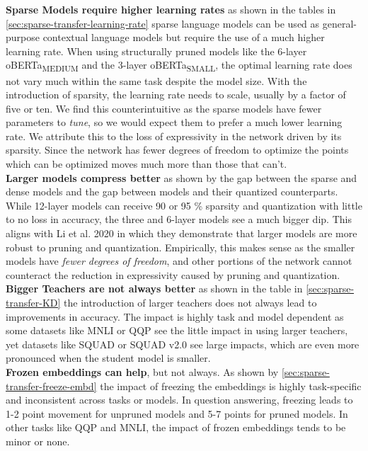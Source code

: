 \textbf{Sparse Models require higher learning rates} as shown in the tables in \ref{sec:sparse-transfer-learning-rate} sparse language models can be used as general-purpose contextual language models but require the use of a much higher learning rate. When using structurally pruned models like the 6-layer oBERTa\textsubscript{MEDIUM} and the 3-layer oBERTa\textsubscript{SMALL}, the optimal learning rate does not vary much within the same task despite the model size. With the introduction of sparsity, the learning rate needs to scale, usually by a factor of five or ten. We find this counterintuitive as the sparse models have fewer parameters to \textit{tune}, so we would expect them to prefer a much lower learning rate. We attribute this to the loss of expressivity in the network driven by its sparsity. Since the network has fewer degrees of freedom to optimize the points which can be optimized moves much more than those that can't. \\
\textbf{Larger models compress better} as shown by the gap between the sparse and dense models and the gap between models and their quantized counterparts. While 12-layer models can receive 90 or 95 \% sparsity and quantization with little to no loss in accuracy, the three and 6-layer models see a much bigger dip. This aligns with Li et al. 2020 \cite{Li2020TrainLT} in which they demonstrate that larger models are more robust to pruning and quantization. Empirically, this makes sense as the smaller models have \textit{fewer degrees of freedom}, and other portions of the network cannot counteract the reduction in expressivity caused by pruning and quantization.   \\
\textbf{Bigger Teachers are not always better} as shown in the table in \ref{sec:sparse-transfer-KD} the introduction of larger teachers does not always lead to improvements in accuracy. The impact is highly task and model dependent as some datasets like MNLI or QQP see the little impact in using larger teachers, yet datasets like SQUAD or SQUAD v2.0  see large impacts, which are even more pronounced when the student model is smaller. \\
\textbf{Frozen embeddings can help}, but not always. As shown by \ref{sec:sparse-transfer-freeze-embd} the impact of freezing the embeddings is highly task-specific and inconsistent across tasks or models. In question answering, freezing leads to 1-2 point movement for unpruned models and 5-7 points for pruned models. In other tasks like QQP and MNLI, the impact of frozen embeddings tends to be minor or none. 